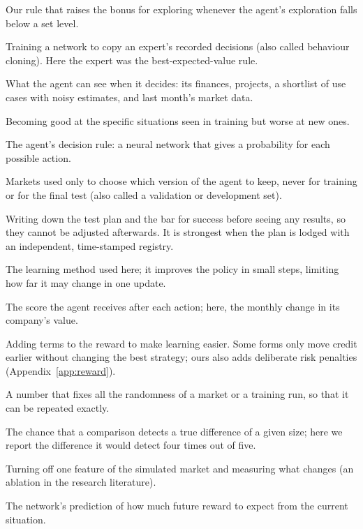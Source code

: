 \documentclass[11pt]{article}
\begin{document}
\begin{description}[style=unboxed, leftmargin=0pt, itemsep=3pt]
\item[Exploration floor.] Our rule that raises the bonus for exploring whenever the agent's exploration falls below a set level.
\item[Imitation learning.] Training a network to copy an expert's recorded decisions (also called behaviour cloning). Here the expert was the best-expected-value rule.
\item[Observation.] What the agent can see when it decides: its finances, projects, a shortlist of use cases with noisy estimates, and last month's market data.
\item[Overfitting.] Becoming good at the specific situations seen in training but worse at new ones.
\item[Policy.] The agent's decision rule: a neural network that gives a probability for each possible action.
\item[Practice markets.] Markets used only to choose which version of the agent to keep, never for training or for the final test (also called a validation or development set).
\item[Pre-registration.] Writing down the test plan and the bar for success before seeing any results, so they cannot be adjusted afterwards. It is strongest when the plan is lodged with an independent, time-stamped registry.
\item[Proximal Policy Optimisation (PPO).] The learning method used here; it improves the policy in small steps, limiting how far it may change in one update.
\item[Reward.] The score the agent receives after each action; here, the monthly change in its company's value.
\item[Reward shaping.] Adding terms to the reward to make learning easier. Some forms only move credit earlier without changing the best strategy; ours also adds deliberate risk penalties (Appendix~\ref{app:reward}).
\item[Seed.] A number that fixes all the randomness of a market or a training run, so that it can be repeated exactly.
\item[Statistical power.] The chance that a comparison detects a true difference of a given size; here we report the difference it would detect four times out of five.
\item[Switch-off test.] Turning off one feature of the simulated market and measuring what changes (an ablation in the research literature).
\item[Value function.] The network's prediction of how much future reward to expect from the current situation.
\end{description}
\end{document}
